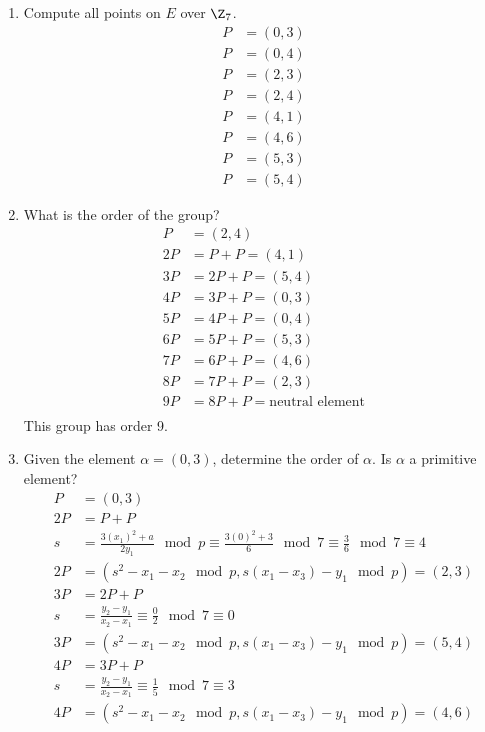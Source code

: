 \documentclass{math}
\begin{document}
\begin{enumerate}
  \item Compute all points on \( E \) over \( \Z_7 \).
  \begin{align*}
    P &= (0,3) \\
    P &= (0,4) \\
    P &= (2,3) \\
    P &= (2,4) \\
    P &= (4,1) \\
    P &= (4,6) \\
    P &= (5,3) \\
    P &= (5,4)
  \end{align*}
  \item What is the order of the group? \\
  \begin{align*}
    P &= (2,4) \\
    2P &= P+P = (4,1) \\
    3P &= 2P+P = (5,4) \\
    4P &= 3P+P = (0,3) \\
    5P &= 4P+P = (0,4) \\
    6P &= 5P+P = (5,3) \\
    7P &= 6P+P = (4,6) \\
    8P &= 7P+P = (2,3) \\
    9P &= 8P+P = \text{neutral element} \\
  \end{align*}
  This group has order 9.
  \item Given the element \( \alpha = (0,3) \), determine the order of
    \( \alpha \). Is \( \alpha \) a primitive element?
  \begin{align*}
    P &= (0,3) \\
    2P &= P+P \\
    s &= \frac{3(x_1)^2+a}{2y_1}\mod p \equiv \frac{3(0)^2+3}{6}\mod 7 \equiv
      \frac{3}{6}\mod 7 \equiv 4 \\
    2P &= (s^2-x_1-x_2\mod p, s(x_1-x_3)-y_1\mod p) = (2,3) \\
    3P &= 2P+P \\
    s &= \frac{y_2-y_1}{x_2-x_1} \equiv \frac{0}{2}\mod7 \equiv 0 \\
    3P &= (s^2-x_1-x_2\mod p, s(x_1-x_3)-y_1\mod p) = (5,4) \\
    4P &= 3P+P \\
    s &= \frac{y_2-y_1}{x_2-x_1} \equiv \frac{1}{5}\mod7 \equiv 3 \\
    4P &= (s^2-x_1-x_2\mod p, s(x_1-x_3)-y_1\mod p) = (4,6) \\

\end{align*}
\end{enumerate}
\end{document}
